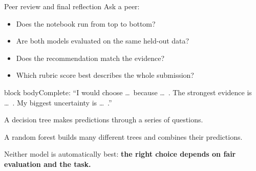 \documentclass[aspectratio=43,11pt]{beamer}
\newcommand{\activity}[1]{\medskip\begin{beamercolorbox}[wd=\linewidth,sep=9pt]{block body}#1\end{beamercolorbox}}
\begin{document}
\begin{frame}{Peer review and final reflection}
Ask a peer:
\begin{itemize}
\item Does the notebook run from top to bottom?
\item Are both models evaluated on the same held-out data?
\item Does the recommendation match the evidence?
\item Which rubric score best describes the whole submission?
\end{itemize}
\activity{Complete: ``I would choose \ldots\ because \ldots\ . The strongest evidence is \ldots\ . My biggest uncertainty is \ldots\ .''}
\end{frame}

\begin{frame}{}
A decision tree makes predictions through a series of questions.\par\medskip
A random forest builds many different trees and combines their predictions.\par\medskip
Neither model is automatically best: \textbf{the right choice depends on fair evaluation and the task.}
\end{frame}
\end{document}

